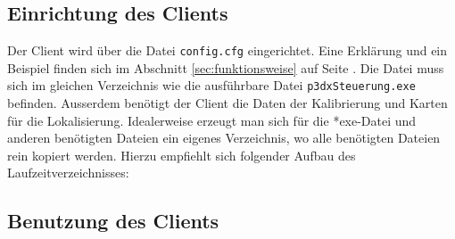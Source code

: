 \subsection{Einrichtung des Clients}%
\label{sec:einrichtung-client}
Der Client wird über die Datei \verb|config.cfg| eingerichtet. Eine
Erklärung und ein Beispiel finden sich im Abschnitt
\ref{sec:funktionsweise} auf Seite \pageref{aufbau_config}. Die Datei
muss sich im gleichen Verzeichnis wie die ausführbare Datei
\verb|p3dxSteuerung.exe| befinden. Ausserdem benötigt der Client die
Daten der Kalibrierung und Karten für die Lokalisierung. Idealerweise
erzeugt man sich für die *exe-Datei und anderen benötigten Dateien ein
eigenes Verzeichnis, wo alle benötigten Dateien rein kopiert werden.  Hierzu
empfiehlt sich folgender Aufbau des Laufzeitverzeichnisses: 

\subsection{Benutzung des Clients}
\label{sec:benutz-des-clients}
